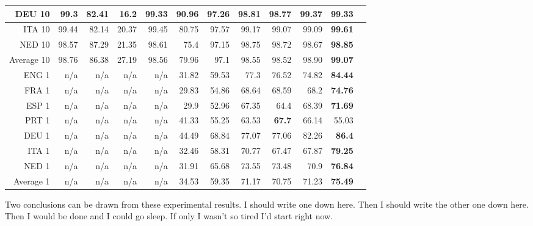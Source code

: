 \begin{sidewaystable}
\begin{tabular}{|r|r|r|r|r|r|r|r|r|r|r|r|}
\hline
DEU 10  & 99.3 &	82.41 &	16.2 &	99.33 &	90.96 &	97.26 &	98.81 &	98.77 &	{\bf 99.37} &	99.33\\
\hline
ITA 10 & 99.44 &	82.14 &	20.37 &	99.45 &	80.75 &	97.57 &	99.17 &	99.07 &	99.09 &	{\bf 99.61}\\
\hline
NED 10 & 98.57 &	87.29 &	21.35 &	98.61 &	75.4 &	97.15 &	98.75 &	98.72 &	98.67 &	{\bf 98.85}\\
\hline
Average 10    & 98.76 & 86.38 & 27.19 & 98.56 & 79.96 & 97.1  & 98.55 & 98.52 & 98.90 & {\bf 99.07}\\
\hline
ENG 1 & n/a & n/a & n/a & n/a & 31.82 & 59.53 & 77.3 & 76.52 &  74.82 & {\bf 84.44}\\
\hline
FRA 1 & n/a & n/a & n/a & n/a & 29.83 & 54.86 & 68.64 & 68.59 &  68.2 & {\bf 74.76}\\
\hline
ESP 1 & n/a &	n/a &	n/a &	n/a &	29.9 &	52.96 &	67.35 &	64.4 &	68.39 &	{\bf 71.69}\\
\hline
PRT 1 & n/a &	n/a &	n/a &	n/a &	41.33 &	55.25 &	63.53 &	{\bf 67.7} &	66.14 &	55.03\\
\hline
DEU 1 & n/a &	n/a &	n/a &	n/a &	44.49 &	68.84 &	77.07 &	77.06 &	82.26 &	{\bf 86.4}\\
\hline
ITA 1 & n/a &	n/a &	n/a &	n/a &	32.46 &	58.31 &	70.77 &	67.47 &	67.87 &	{\bf 79.25}\\
\hline
NED 1 & n/a &	n/a &	n/a &	n/a &	31.91 &	65.68 &	73.55 &	73.48 &	70.9 &	{\bf 76.84}\\
\hline
Average 1     & n/a   & n/a   & n/a   & n/a   & 34.53 & 59.35 & 71.17 & 70.75 & 71.23 & {\bf 75.49}\\
\hline
\end{tabular}
\end{sidewaystable}

Two conclusions can be drawn from these experimental results.  I should
write one down here.  Then I should write the other one down here.
Then I would be done and I could go sleep.  If only I wasn't so tired
I'd start right now.

